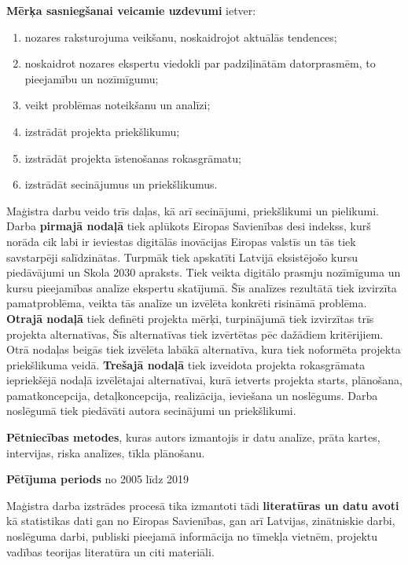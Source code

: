\par
\textbf{Mērķa sasniegšanai veicamie uzdevumi} ietver:
\begin{enumerate}
    \item nozares raksturojuma veikšanu, noskaidrojot aktuālās tendences;
    \item noskaidrot nozares ekspertu viedokli par padziļinātām datorprasmēm, to pieejamību un nozīmīgumu;
    \item veikt problēmas noteikšanu un analīzi;
    \item izstrādāt projekta priekšlikumu;
    \item izstrādāt projekta īstenošanas rokasgrāmatu;
    \item izstrādāt secinājumus un priekšlikumus.
\end{enumerate}
\par
Maģistra darbu veido trīs daļas, kā arī secinājumi, priekšlikumi un pielikumi.
Darba \textbf{pirmajā nodaļā} tiek aplūkots Eiropas Savienības \acrshort{desi} indekss, kurš norāda
cik labi ir ieviestas digitālās inovācijas Eiropas valstīs un tās tiek savstarpēji salīdzinātas. Turpmāk
tiek apskatīti Latvijā eksistējošo kursu piedāvājumi un Skola 2030 apraksts. Tiek veikta digitālo prasmju
nozīmīguma un kursu pieejamības analīze ekspertu skatījumā. Šīs analīzes rezultātā tiek izvirzīta 
pamatproblēma, veikta tās analīze un izvēlēta konkrēti risināmā problēma. 
\textbf{Otrajā nodaļā} tiek definēti projekta mērķi, turpinājumā tiek izvirzītas trīs projekta alternatīvas,
Šīs alternatīvas tiek izvērtētas pēc dažādiem kritērijiem. Otrā nodaļas beigās tiek izvēlēta labākā alternatīva, 
kura tiek noformēta projekta priekšlikuma veidā. 
\textbf{Trešajā nodaļā} tiek izveidota projekta rokasgrāmata iepriekšējā nodaļā izvēlētajai alternatīvai,
kurā ietverts projekta starts, plānošana, pamatkoncepcija, detaļkoncepcija, realizācija, ieviešana un noslēgums. 
Darba noslēgumā tiek piedāvāti autora secinājumi un priekšlikumi.
\par
\textbf{Pētniecības metodes}, kuras autors izmantojis ir datu analīze,
prāta kartes, intervijas, riska analīzes, tīkla plānošanu.
\par
\textbf{Pētījuma periods} no 2005 līdz 2019
\par
Maģistra darba izstrādes procesā tika izmantoti tādi \textbf{literatūras un datu avoti} kā statistikas dati
gan no Eiropas Savienības, gan arī Latvijas, zinātniskie darbi, noslēguma darbi, publiski pieejamā informācija
no tīmekļa vietnēm, projektu vadības teorijas literatūra un citi materiāli.
